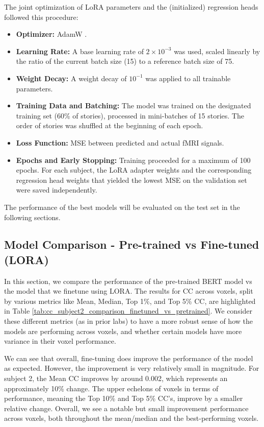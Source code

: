 \documentclass[10pt,letterpaper]{article}
\begin{document}
The joint optimization of LoRA parameters and the (initialized) regression heads followed this procedure:
\begin{itemize}
    \item \textbf{Optimizer:} AdamW \cite{loshchilov2017decoupled}.
    \item \textbf{Learning Rate:} A base learning rate of $2 \times 10^{-3}$ was used, scaled linearly by the ratio of the current batch size (15) to a reference batch size of 75.
    \item \textbf{Weight Decay:} A weight decay of $10^{-1}$ was applied to all trainable parameters.
    \item \textbf{Training Data and Batching:} The model was trained on the designated training set (60\% of stories), processed in mini-batches of 15 stories. The order of stories was shuffled at the beginning of each epoch.
    \item \textbf{Loss Function:} MSE between predicted and actual fMRI signals.
    \item \textbf{Epochs and Early Stopping:} Training proceeded for a maximum of 100 epochs. For each subject, the LoRA adapter weights and the corresponding regression head weights that yielded the lowest MSE on the validation set were saved independently.
\end{itemize}

The performance of the best models will be evaluated on the test set in the following sections.

\subsection{Model Comparison - Pre-trained vs Fine-tuned (LORA)}
In this section, we compare the performance of the pre-trained BERT model vs the model that we finetune using LORA. The results for CC across voxels, split by various metrics like Mean, Median, Top 1\%, and Top 5\% CC, are highlighted in Table \ref{tab:cc_subject2_comparison_finetuned_vs_pretrained}. We consider these different metrics (as in prior labs) to have a more robust sense of how the models are performing across voxels, and whether certain models have more variance in their voxel performance.

We can see that overall, fine-tuning does improve the performance of the model as expected. However, the improvement is very relatively small in magnitude. For subject 2, the Mean CC improves by around 0.002, which represents an approximately 10\% change. The upper echelons of voxels in terms of performance, meaning the Top 10\% and Top 5\% CC's, improve by a smaller relative change. Overall, we see a notable but small improvement performance across voxels, both throughout the mean/median and the best-performing voxels.
\end{document}
